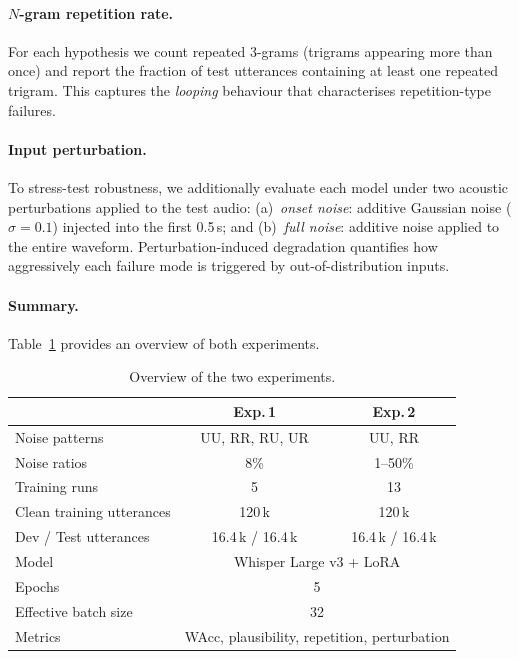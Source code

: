 \paragraph{$N$-gram repetition rate.}
For each hypothesis we count repeated 3-grams (trigrams appearing more
than once) and report the fraction of test utterances containing at least
one repeated trigram.
This captures the \emph{looping} behaviour that characterises
repetition-type failures.

\paragraph{Input perturbation.}
To stress-test robustness, we additionally evaluate each model under two
acoustic perturbations applied to the test audio:
(a)~\emph{onset noise}: additive Gaussian noise ($\sigma{=}0.1$) injected
into the first 0.5\,s; and
(b)~\emph{full noise}: additive noise applied to the entire waveform.
Perturbation-induced degradation quantifies how aggressively each failure
mode is triggered by out-of-distribution inputs.

\paragraph{Summary.}
Table~\ref{tab:experiment-summary} provides an overview of both experiments.

\begin{table}[t]
\centering
\caption{Overview of the two experiments.}
\label{tab:experiment-summary}
\renewcommand{\arraystretch}{1.15}
\begin{tabular}{@{}lcc@{}}
\toprule
                          & \textbf{Exp.\,1} & \textbf{Exp.\,2} \\
\midrule
Noise patterns            & UU, RR, RU, UR   & UU, RR            \\
Noise ratios              & 8\%              & 1--50\%           \\
Training runs             & 5                & 13                \\
Clean training utterances & 120\,k           & 120\,k            \\
Dev / Test utterances     & 16.4\,k / 16.4\,k & 16.4\,k / 16.4\,k \\
Model                     & \multicolumn{2}{c}{Whisper Large v3 + LoRA} \\
Epochs                    & \multicolumn{2}{c}{5}               \\
Effective batch size       & \multicolumn{2}{c}{32}              \\
Metrics                   & \multicolumn{2}{c}{WAcc, plausibility, repetition, perturbation} \\
\bottomrule
\end{tabular}
\end{table}
